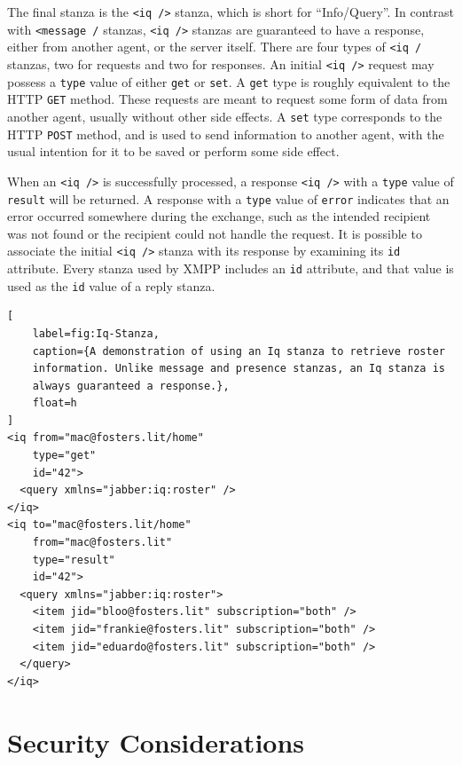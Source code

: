 The final stanza is the \texttt{<iq />} stanza, which is short for
``Info/Query''. In contrast with \texttt{<message /} stanzas, \texttt{<iq
/>} stanzas are guaranteed to have a response, either from another agent, or
the server itself. There are four types of \texttt{<iq /} stanzas, two for
requests and two for responses. An initial \texttt{<iq />} request may possess a
\texttt{type} value of either \texttt{get} or \texttt{set}. A \texttt{get} type
is roughly equivalent to the HTTP \texttt{GET} method. These requests are meant
to request some form of data from another agent, usually without other side
effects. A \texttt{set} type corresponds to the HTTP \texttt{POST} method, and
is used to send information to another agent, with the usual intention for it to
be saved or perform some side effect.

When an \texttt{<iq />} is successfully processed, a response \texttt{<iq />}
with a \texttt{type} value of \texttt{result} will be returned. A response
with a \texttt{type} value of \texttt{error} indicates that an error occurred
somewhere during the exchange, such as the intended recipient was not found or
the recipient could not handle the request. It is possible to associate the
initial \texttt{<iq />} stanza with its response by examining its \texttt{id}
attribute. Every stanza used by XMPP includes an \texttt{id} attribute, and that
value is used as the \texttt{id} value of a reply stanza.

\begin{lstlisting}[
    label=fig:Iq-Stanza,
    caption={A demonstration of using an Iq stanza to retrieve roster
    information. Unlike message and presence stanzas, an Iq stanza is
    always guaranteed a response.},
    float=h
]
<iq from="mac@fosters.lit/home" 
    type="get" 
    id="42">
  <query xmlns="jabber:iq:roster" />
</iq>
<iq to="mac@fosters.lit/home" 
    from="mac@fosters.lit" 
    type="result" 
    id="42">
  <query xmlns="jabber:iq:roster">
    <item jid="bloo@fosters.lit" subscription="both" />
    <item jid="frankie@fosters.lit" subscription="both" />
    <item jid="eduardo@fosters.lit" subscription="both" />
  </query>
</iq>
\end{lstlisting}

\section{Security Considerations}
\label{sec:Security-Considerations}

